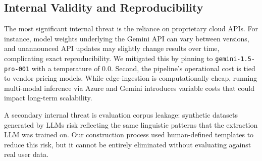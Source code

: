 \subsection{Internal Validity and Reproducibility}
The most significant internal threat is the reliance on proprietary cloud APIs. For instance, model weights underlying the Gemini API can vary between versions, and unannounced API updates may slightly change results over time, complicating exact reproducibility. We mitigated this by pinning to \texttt{gemini-1.5-pro-001} with a temperature of $0.0$. Second, the pipeline's operational cost is tied to vendor pricing models. While edge-ingestion is computationally cheap, running multi-modal inference via Azure and Gemini introduces variable costs that could impact long-term scalability.

A secondary internal threat is evaluation corpus leakage: synthetic datasets generated by LLMs risk reflecting the same linguistic patterns that the extraction LLM was trained on. Our construction process used human-defined templates to reduce this risk, but it cannot be entirely eliminated without evaluating against real user data.
